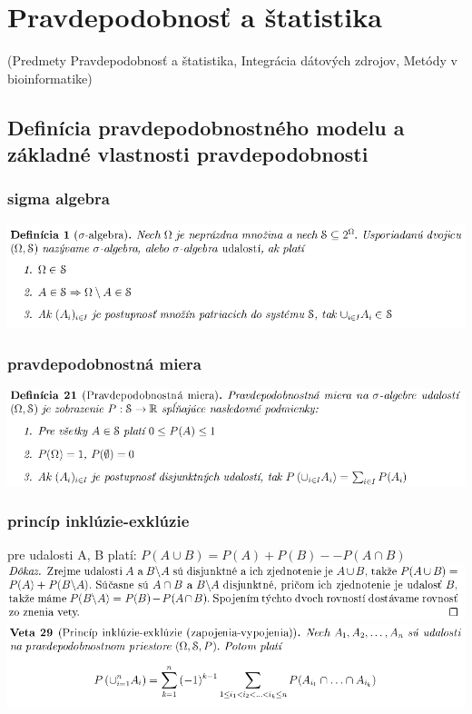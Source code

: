 \chapter[Pravdepodobnosť a štatistika]{Pravdepodobnosť a štatistika}
\label{pravdepodobnost_a_statistika} %

(Predmety Pravdepodobnosť a štatistika, Integrácia dátových zdrojov, Metódy v bioinformatike)

\section{Definícia pravdepodobnostného modelu a základné vlastnosti pravdepodobnosti}

\subsection {sigma algebra}
\includegraphics[width=1\textwidth]{images/pravdepodobnost/sigma_alg}\\
\subsection {pravdepodobnostná miera}
\includegraphics[width=1\textwidth]{images/pravdepodobnost/pravd_mier}\\
\subsection {princíp inklúzie-exklúzie}
pre udalosti A, B platí: $P (A \cup B) = P (A) + P (B) -- P (A \cap B)$\\
\includegraphics[width=1\textwidth]{images/pravdepodobnost/inklu_1}\\
\includegraphics[width=1\textwidth]{images/pravdepodobnost/inkluzia_ex}\\

